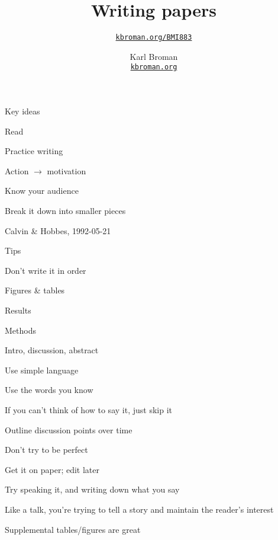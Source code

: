 \documentclass[aspectratio=169,12pt,t]{beamer}
\title{Writing papers}
\subtitle{}
\author{\href{https://kbroman.org/BMI883}{\tt kbroman.org/BMI883} }
\institute{}
\date{\small \hspace{3in} Karl Broman \\
  \hspace{3in} \href{https://kbroman.org}{\color{foreground}
    \small \tt kbroman.org}}
\begin{document}
{
\frame{
  \titlepage
} }




\begin{frame}{Key ideas}


  \bbi
\item Read
\item Practice writing
\item Action $\longrightarrow$ motivation
\item Know your audience
\item Break it down into smaller pieces
  \ei

\end{frame}


\begin{frame}{}

\vspace*{20mm}


\vfill

\hfill {\footnotesize Calvin \& Hobbes, 1992-05-21}

\end{frame}



\begin{frame}{Tips}

      \bi
    \item Don't write it in order
      \bi
    \item Figures \& tables
    \item Results
    \item Methods
    \item Intro, discussion, abstract
      \ei
    \item Use simple language
      \bi
    \item Use the words you know
    \item If you can't think of how to say it, just skip it
      \ei
    \item Outline discussion points over time
    \item Don't try to be perfect
      \bi
    \item Get it on paper; edit later
      \ei
    \item Try speaking it, and writing down what you say
      \bi
      \item Like a talk, you're trying to tell a story and maintain
        the reader's interest
      \ei
    \item Supplemental tables/figures are great
    \ei


\end{frame}
\end{document}
